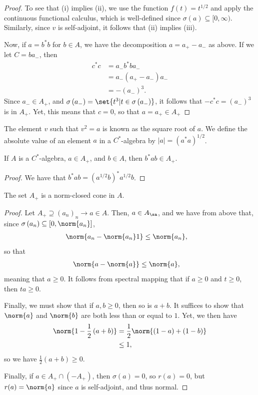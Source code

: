 \documentclass[10pt]{mypackage}
\begin{document}
\begin{proof}
  To see that (i) implies (ii), we use the function $f(t) = t^{1/2}$ and apply the continuous functional calculus, which is well-defined since $\sigma(a)\subseteq [0,\infty)$. Similarly, since $v$ is self-adjoint, it follows that (ii) implies (iii).

  Now, if $a = b^{\ast}b$ for $b\in A$, we have the decomposition $a = a_{+} - a_{-}$ as above. If we let $C = ba_{-}$, then
  \begin{align*}
    c^{\ast}c &= a_{-} b^{\ast}ba_{-}\\
              &= a_{-}\left( a_{+}-a_{-} \right)a_{-}\\
              &= -\left( a_{-} \right)^{3}.
  \end{align*}
  Since $a_{-}\in A_{+}$, and $\sigma\left( a_{-} \right) = \set{t^3 | t\in \sigma\left(a_{-}\right)}$, it follows that $-c^{\ast}c = \left( a_{-} \right)^3$ is in $A_{+}$. Yet, this means that $c = 0$, so that $a = a_{+}\in A_{+}$
\end{proof}
The element $v$ such that $v^2 = a$ is known as the square root of $a$. We define the absolute value of an element $a$ in a $C^{\ast}$-algebra by $\left\vert a \right\vert = \left( a^{\ast}a \right)^{1/2}$.
\begin{corollary}
  If $A$ is a $C^{\ast}$-algebra, $a\in A_{+}$, and $b\in A$, then $b^{\ast}ab\in A_{+}$.
\end{corollary}
\begin{proof}
  We have that $b^{\ast}ab = \left( a^{1/2}b \right)^{\ast}a^{1/2}b$.
\end{proof}
\begin{proposition}
  The set $A_{+}$ is a norm-closed cone in $A$.
\end{proposition}
\begin{proof}
  Let $A_{+}\supseteq \left( a_n \right)_n\rightarrow a\in A$. Then, $a\in A_{\sa}$, and we have from above that, since $\sigma\left( a_n \right)\subseteq \left[ 0,\norm{a_n} \right]$,
  \begin{align*}
    \norm{a_n - \norm{a_n} 1} &\leq \norm{a_n},
  \end{align*}
  so that
  \begin{align*}
    \norm{a-\norm{a}} &\leq \norm{a},
  \end{align*}
  meaning that $a\geq 0$. It follows from spectral mapping that if $a \geq 0$ and $t\geq 0$, then $ta \geq 0$.

  Finally, we must show that if $a,b\geq 0$, then so is $a + b$. It suffices to show that $\norm{a}$ and $\norm{b}$ are both less than or equal to $1$. Yet, we then have
  \begin{align*}
    \norm{1-\frac{1}{2}\left( a+b \right)} &= \frac{1}{2}\norm{\left( 1-a \right) + \left( 1-b \right)}\\
                                           &\leq 1,
  \end{align*}
  so we have $\frac{1}{2}\left( a+b \right) \geq 0$.

  Finally, if $a\in A_{+}\cap \left( -A_{+} \right)$, then $\sigma(a) = 0$, so $r(a) = 0$, but $r(a) = \norm{a}$ since $a$ is self-adjoint, and thus normal.
\end{proof}
\end{document}
